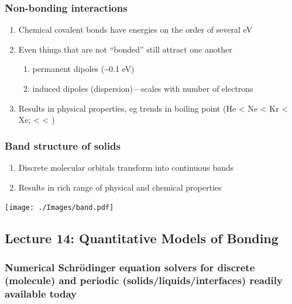 \documentclass[11pt]{article}
\begin{document}
\subsubsection{Non-bonding interactions}
\label{sec:orge3d84d3}
\begin{enumerate}
\item Chemical covalent bonds have energies on the order of several eV
\item Even things that are not ``bonded'' still attract one another
\begin{enumerate}
\item permanent dipoles (\textasciitilde{}0.1 eV)
\item induced dipoles (dispersion)---scales with number of electrons
\end{enumerate}
\item Results in physical properties, eg trends in boiling point (He < Ne < Kr < Xe;  <  <  )
\end{enumerate}
\subsubsection{Band structure of solids}
\label{sec:org5f05447}
\begin{enumerate}
\item Discrete molecular orbitals transform into continuous bands
\item Results in rich range of physical and chemical properties
\end{enumerate}

\begin{center}
\texttt{[image: ./Images/band.pdf]}
\end{center}
\subsection{Lecture 14: Quantitative Models of Bonding}
\label{sec:orgaa4ce02}
\subsubsection{Numerical Schr\"{o}dinger equation solvers for discrete (molecule) and periodic (solids/liquids/interfaces) readily available today}
\label{sec:org29ce879}
\end{document}
